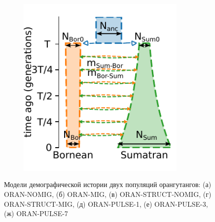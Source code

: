 \begin{figure}[ht!]
\begin{subfigure}[b]{0.33\linewidth}
        \caption{}
        \label{fig:experiments:sim_2:oran_pulse_3}
    \end{subfigure}%
    \begin{subfigure}[b]{0.33\linewidth}
        \centering
        \includegraphics[width=0.9\textwidth]{images_experiments/suimulation_2_stdpopsim/picture_ORAN_PULSE_7.pdf}
        \caption{}
        \label{fig:experiments:sim_2:oran_pulse_7}
    \end{subfigure}
    \caption{Модели демографической истории двух популяций орангутангов: (а) ORAN-NOMIG, (б) ORAN-MIG, (в) ORAN-STRUCT-NOMIG, (г) ORAN-STRUCT-MIG, (д) ORAN-PULSE-1, (е) ORAN-PULSE-3, (ж) ORAN-PULSE-7}
    \label{fig:part2:experiments:sim2:models}
\end{figure}

